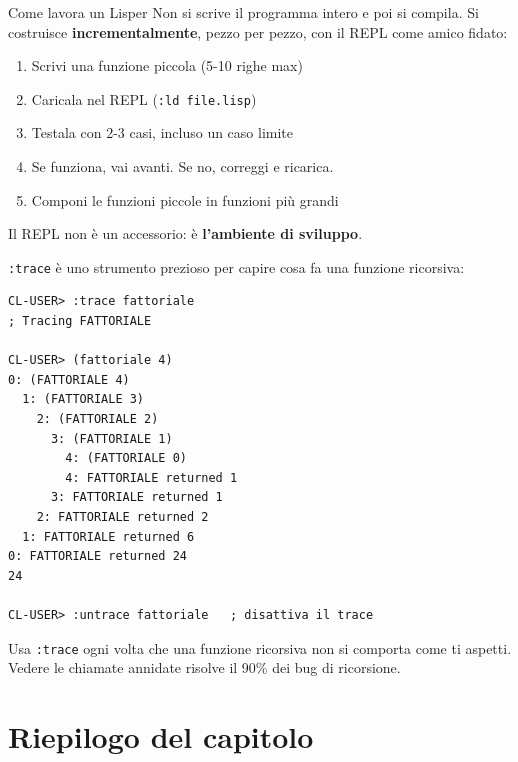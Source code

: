 \begin{concetto}{Come lavora un Lisper}
Non si scrive il programma intero e poi si compila. Si costruisce
\textbf{incrementalmente}, pezzo per pezzo, con il REPL come
amico fidato:

\medskip
\begin{enumerate}
  \item Scrivi una funzione piccola (5-10 righe max)
  \item Caricala nel REPL (\texttt{:ld file.lisp})
  \item Testala con 2-3 casi, incluso un caso limite
  \item Se funziona, vai avanti. Se no, correggi e ricarica.
  \item Componi le funzioni piccole in funzioni più grandi
\end{enumerate}

\medskip
Il REPL non è un accessorio: è \textbf{l'ambiente di sviluppo}.
\end{concetto}


\texttt{:trace} è uno strumento prezioso per capire cosa fa una
funzione ricorsiva:

\begin{esempio}
\begin{lstlisting}
CL-USER> :trace fattoriale
; Tracing FATTORIALE

CL-USER> (fattoriale 4)
0: (FATTORIALE 4)
  1: (FATTORIALE 3)
    2: (FATTORIALE 2)
      3: (FATTORIALE 1)
        4: (FATTORIALE 0)
        4: FATTORIALE returned 1
      3: FATTORIALE returned 1
    2: FATTORIALE returned 2
  1: FATTORIALE returned 6
0: FATTORIALE returned 24
24

CL-USER> :untrace fattoriale   ; disattiva il trace
\end{lstlisting}
\end{esempio}


\begin{intuizione}
Usa \texttt{:trace} ogni volta che una funzione ricorsiva non si
comporta come ti aspetti. Vedere le chiamate annidate risolve il
90\% dei bug di ricorsione.
\end{intuizione}

\section*{Riepilogo del capitolo}

